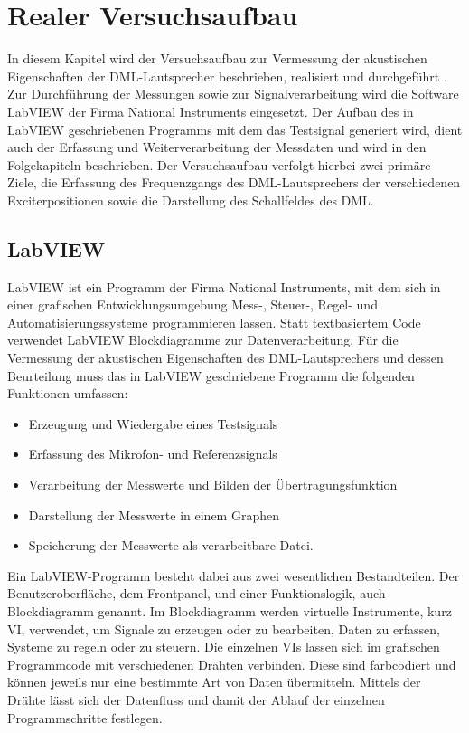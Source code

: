 \clearpage

\section{Realer Versuchsaufbau}

In diesem Kapitel wird der Versuchsaufbau zur Vermessung der akustischen Eigenschaften der DML-Lautsprecher beschrieben, realisiert und durchgeführt \cite{Moeser2018}. Zur Durchführung der Messungen sowie zur Signalverarbeitung wird die Software LabVIEW der Firma National Instruments eingesetzt. Der Aufbau des in LabVIEW geschriebenen Programms mit dem das Testsignal generiert wird, dient auch der Erfassung und Weiterverarbeitung der Messdaten und wird in den Folgekapiteln beschrieben.
Der Versuchsaufbau verfolgt hierbei zwei primäre Ziele, die Erfassung des Frequenzgangs des DML-Lautsprechers der verschiedenen Exciterpositionen sowie die Darstellung des Schallfeldes des DML. 

 
\subsection{LabVIEW}

LabVIEW ist ein Programm der Firma National Instruments, mit dem sich in einer grafischen Entwicklungsumgebung Mess-, Steuer-, Regel- und Automatisierungssysteme programmieren lassen. Statt textbasiertem Code verwendet LabVIEW Blockdiagramme zur Datenverarbeitung.
Für die Vermessung der akustischen Eigenschaften des DML-Lautsprechers und dessen Beurteilung muss das in LabVIEW geschriebene Programm die folgenden Funktionen umfassen: 

\begin{itemize}
    \item Erzeugung und Wiedergabe eines Testsignals 
    \item Erfassung des Mikrofon- und Referenzsignals
    \item Verarbeitung der Messwerte und Bilden der Übertragungsfunktion
    \item Darstellung der Messwerte in einem Graphen
    \item Speicherung der Messwerte als verarbeitbare Datei.
\end{itemize}

 Ein LabVIEW-Programm besteht dabei aus zwei wesentlichen Bestandteilen. Der Benutzeroberfläche, dem Frontpanel, und einer Funktionslogik, auch Blockdiagramm genannt. Im Blockdiagramm werden virtuelle Instrumente, kurz VI, verwendet, um Signale zu erzeugen oder zu bearbeiten, Daten zu erfassen, Systeme zu regeln oder zu steuern. Die einzelnen VIs lassen sich im grafischen Programmcode mit verschiedenen Drähten verbinden. Diese sind farbcodiert und können jeweils nur eine bestimmte Art von Daten übermitteln. Mittels der Drähte lässt sich der Datenfluss und damit der Ablauf der einzelnen Programmschritte festlegen.  

